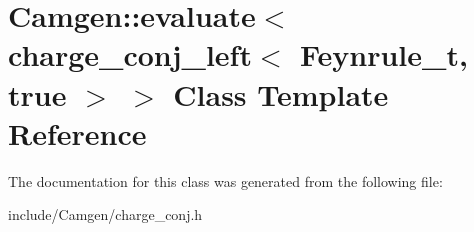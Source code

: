 \hypertarget{a00148}{}\section{Camgen\+:\+:evaluate$<$ charge\+\_\+conj\+\_\+left$<$ Feynrule\+\_\+t, true $>$ $>$ Class Template Reference}
\label{a00148}


The documentation for this class was generated from the following file\+:\begin{DoxyCompactItemize}
\item 
include/\+Camgen/charge\+\_\+conj.\+h\end{DoxyCompactItemize}
